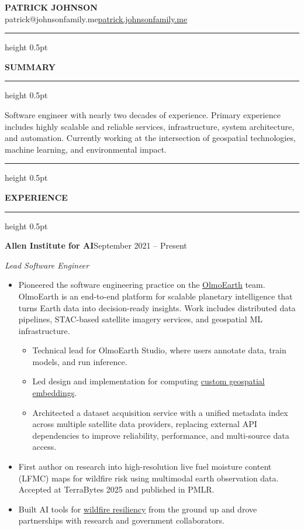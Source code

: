 \documentclass[10pt,letterpaper]{article}
\newcommand{\ressection}[1]{%
  \vspace{3pt}%
  {\color{rulecolor}\hrule height 0.5pt}%
  \vspace{3pt}%
  {\normalsize\bfseries\color{sectionblue}#1}%
  \vspace{3pt}%
  {\color{rulecolor}\hrule height 0.5pt}%
  \vspace{3pt}%
}
\newcommand{\jobheader}[2]{%
  \vspace{3pt}%
  \hspace{1em}\textbf{#1}\hfill#2%
  \vspace{1pt}%
}
\newcommand{\jobtitle}[1]{%
  \par\hspace{1em}\textit{#1}%
  \vspace{2pt}%
}
\begin{document}
\begin{center}
  {\large\bfseries\color{sectionblue}PATRICK JOHNSON}\\[4pt]
  {\small patrick@johnsonfamily.me\quad\textbullet\quad\href{https://patrick.johnsonfamily.me/}{patrick.johnsonfamily.me}}
\end{center}

\ressection{SUMMARY}

\hspace{1em}\parbox{\dimexpr\textwidth-1em}{%
Software engineer with nearly two decades of experience. Primary experience includes highly scalable and reliable services, infrastructure, system architecture, and automation. Currently working at the intersection of geospatial technologies, machine learning, and environmental impact.%
}

\ressection{EXPERIENCE}

\jobheader{Allen Institute for AI}{September 2021 -- Present}
\jobtitle{Lead Software Engineer}

\begin{itemize}
  \item Pioneered the software engineering practice on the \href{https://allenai.org/olmoearth}{OlmoEarth} team. OlmoEarth is an end-to-end platform for scalable planetary intelligence that turns Earth data into decision-ready insights. Work includes distributed data pipelines, STAC-based satellite imagery services, and geospatial ML infrastructure.
    \begin{itemize}
      \item Technical lead for OlmoEarth Studio, where users annotate data, train models, and run inference.
      \item Led design and implementation for computing \href{https://allenai.org/blog/olmoearth-embeddings}{custom geospatial embeddings}.
      \item Architected a dataset acquisition service with a unified metadata index across multiple satellite data providers, replacing external API dependencies to improve reliability, performance, and multi-source data access.
    \end{itemize}
  \item First author on research into high-resolution live fuel moisture content (LFMC) maps for wildfire risk using multimodal earth observation data. Accepted at TerraBytes 2025 and published in PMLR.
  \item Built AI tools for \href{https://allenai.org/wildlands}{wildfire resiliency} from the ground up and drove partnerships with research and government collaborators.
\end{itemize}
\end{document}
